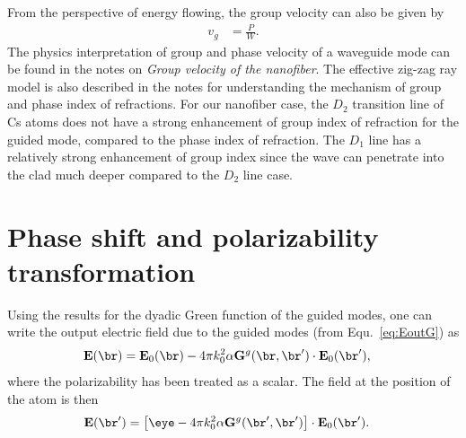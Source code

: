 \documentclass[]{report}
\begin{document}
From the perspective of energy flowing, the group velocity can also be given by
\begin{align}
v_g&=\frac{P}{W}.
\end{align}
The physics interpretation of group and phase velocity of a waveguide mode can be found in the notes on \textit{Group velocity of the nanofiber}. The effective zig-zag ray model is also described in the notes for understanding the mechanism of group and phase index of refractions. For our nanofiber case, the $ D_2 $ transition line of Cs atoms does not have a strong enhancement of group index of refraction for the guided mode, compared to the phase index of refraction. The $ D_1 $ line has a relatively strong enhancement of group index since the wave can penetrate into the clad much deeper compared to the $ D_2 $ line case. 

\section{Phase shift and polarizability transformation}
Using the results for the dyadic Green function of the guided modes, one can write the output electric field due to the guided modes (from Equ.~\eqref{eq:EoutG}) as 
\begin{align}
\mathbf{E}(\br) & = \mathbf{E}_0(\br) -4\pi k_0^2 \alpha \mathbf{G}^g(\br,\br')\cdot\mathbf{E}_0(\br'),
\end{align}
where the polarizability has been treated as a scalar. The field at the position of the atom is then
\begin{align}
\mathbf{E}(\br') &= \left[\eye-4\pi k_0^2 \alpha \mathbf{G}^g(\br',\br')\right]\cdot\mathbf{E}_0(\br').
\end{align}
\end{document}
